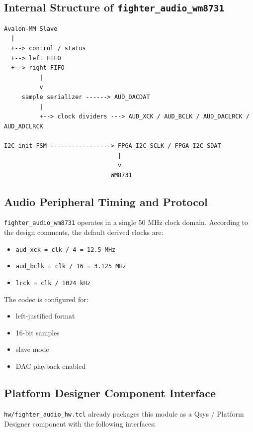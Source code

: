 \documentclass[12pt,a4paper]{article}
\begin{document}
\subsection{Internal Structure of \texttt{fighter\_audio\_wm8731}}

\begin{lstlisting}[style=fighterstyle]
Avalon-MM Slave
  |
  +--> control / status
  +--> left FIFO
  +--> right FIFO
          |
          v
     sample serializer ------> AUD_DACDAT
          |
          +--> clock dividers ---> AUD_XCK / AUD_BCLK / AUD_DACLRCK / AUD_ADCLRCK

I2C init FSM -----------------> FPGA_I2C_SCLK / FPGA_I2C_SDAT
                                |
                                v
                              WM8731
\end{lstlisting}

\subsection{Audio Peripheral Timing and Protocol}

\texttt{fighter\_audio\_wm8731} operates in a single 50 MHz clock domain. According to the design comments, the default derived clocks are:

\begin{itemize}
  \item \texttt{aud\_xck = clk / 4 = 12.5 MHz}
  \item \texttt{aud\_bclk = clk / 16 = 3.125 MHz}
  \item \texttt{lrck = clk / 1024  kHz}
\end{itemize}

The codec is configured for:

\begin{itemize}
  \item left-justified format
  \item 16-bit samples
  \item slave mode
  \item DAC playback enabled
\end{itemize}

\subsection{Platform Designer Component Interface}

\texttt{hw/fighter\_audio\_hw.tcl} already packages this module as a Qsys / Platform Designer component with the following interfaces:
\end{document}
